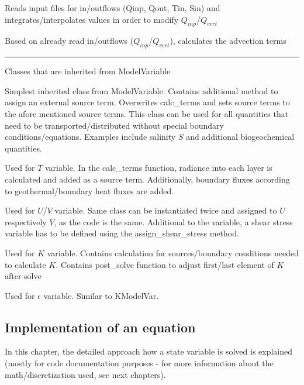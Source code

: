 \documentclass[paper=a4, fontsize=12pt]{article}
\begin{document}
\begin{description}[style=nextline]
		\item[Lateral] Reads input files for in/outflows (Qinp, Qout, Tin, Sin) and integrates/interpolates values in order to modify $Q_{inp}$/$Q_{vert}$
		
		\item[Advection] Based on already read in/outflows ($Q_{inp}$/$Q_{vert}$), calculates the advection terms

 \hrule
\item[Model state variable classes] \noindent Classes that are inherited from ModelVariable
 \begin{description}[style=multiline, leftmargin=17em]
		\item[TranspModelVar] Simplest inherited class from ModelVariable.  Contains additional method to assign an external source term. Overwrites calc\_terms and sets source terms to the afore mentioned source terms. This class can be used for all quantities that need to be transported/distributed without special boundary conditions/equations. Examples include salinity $S$ and additional biogeochemical quantities.
		
		\item[TempModelVar] Used for $T$ variable. In the calc\_terms function, radiance into each layer is calculated and added as a source term. Additionally, boundary fluxes according to geothermal/boundary heat fluxes are added.
		
		\item[UVModelVar] Used for $U$/$V$ variable. Same class can be instantiated twice and assigned to $U$ respectively $V$, as the code is the same. Additional to the variable, a shear stress variable has to be defined using the assign\_shear\_stress method.
		
		\item[KModelVar] Used for $K$ variable. Contains calculation for sources/boundary conditions needed to calculate $K$. Contains post\_solve function to adjust first/last element of $K$ after solve

		\item[EpsModelVar] Used for $\epsilon$ variable. Similar to KModelVar.
\end{description}
\end{description}



\subsection{Implementation of an equation}
In this chapter, the detailed approach how a state variable is solved is explained (mostly for code documentation purposes - for more information about the math/discretization used, see next chapters).
\end{document}
